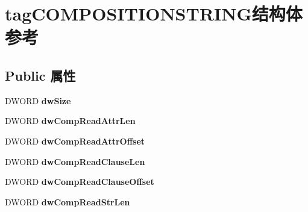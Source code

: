 \hypertarget{structtag_c_o_m_p_o_s_i_t_i_o_n_s_t_r_i_n_g}{}\section{tag\+C\+O\+M\+P\+O\+S\+I\+T\+I\+O\+N\+S\+T\+R\+I\+N\+G结构体 参考}
\label{structtag_c_o_m_p_o_s_i_t_i_o_n_s_t_r_i_n_g}
\subsection*{Public 属性}
\begin{DoxyCompactItemize}
\item 
\mbox{\label{structtag_c_o_m_p_o_s_i_t_i_o_n_s_t_r_i_n_g_ad14b6dbf630e7eff5cbefe4a1cd43163}} 
D\+W\+O\+RD {\bfseries dw\+Size}
\item 
\mbox{\label{structtag_c_o_m_p_o_s_i_t_i_o_n_s_t_r_i_n_g_a09d25a3a95581d2b3c1380a3c8881c28}} 
D\+W\+O\+RD {\bfseries dw\+Comp\+Read\+Attr\+Len}
\item 
\mbox{\label{structtag_c_o_m_p_o_s_i_t_i_o_n_s_t_r_i_n_g_abba6fe1eb9349c5e3575998f8043e0ec}} 
D\+W\+O\+RD {\bfseries dw\+Comp\+Read\+Attr\+Offset}
\item 
\mbox{\label{structtag_c_o_m_p_o_s_i_t_i_o_n_s_t_r_i_n_g_ac3a9501504cbc0ad71fc6c01139443cf}} 
D\+W\+O\+RD {\bfseries dw\+Comp\+Read\+Clause\+Len}
\item 
\mbox{\label{structtag_c_o_m_p_o_s_i_t_i_o_n_s_t_r_i_n_g_aef88bec20a9d8b82445127d024bd31b7}} 
D\+W\+O\+RD {\bfseries dw\+Comp\+Read\+Clause\+Offset}
\item 
\mbox{\label{structtag_c_o_m_p_o_s_i_t_i_o_n_s_t_r_i_n_g_ae18a841197bb4962ca9bfacbeda4bdca}} 
D\+W\+O\+RD {\bfseries dw\+Comp\+Read\+Str\+Len}
\item 
\mbox{\label{structtag_c_o_m_p_o_s_i_t_i_o_n_s_t_r_i_n_g_a06ec78a4614bc9ad31af6598824e4fd2}} 

\end{DoxyCompactItemize}
